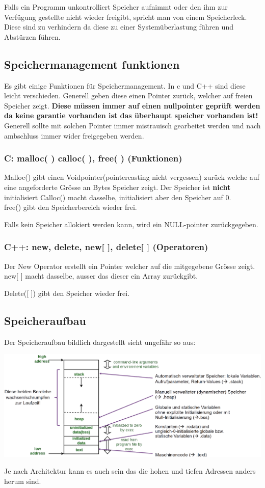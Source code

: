 Falls ein Programm unkontrolliert Speicher aufnimmt oder den ihm zur Verfügung gestellte nicht wieder freigibt, spricht man von einem Speicherleck. 
Diese sind zu verhindern da diese zu einer Systemüberlastung führen und Abstürzen führen.

\subsection{Speichermanagement funktionen}

Es gibt einige Funktionen für Speichermanagement. In c und C++ sind diese leicht verschieden. 
Generell geben diese einen Pointer zurück, welcher auf freien Speicher zeigt. 
\textbf{Diese müssen immer auf einen nullpointer geprüft werden da keine garantie vorhanden ist das überhaupt speicher vorhanden ist!}
Generell sollte mit solchen Pointer immer mistrauisch gearbeitet werden und nach ambschluss immer wider freigegeben werden.

\subsubsection{C: malloc( ) calloc( ), free( ) (Funktionen)}

Malloc() gibt einen Voidpointer(pointercasting nicht vergessen) zurück welche auf eine angeforderte Grösse an Bytes Speicher zeigt. 
Der Speicher ist \textbf{nicht} initialisiert
Calloc() macht dasselbe, initialisiert aber den Speicher auf 0.\\
free() gibt den Speicherbereich wieder frei.



Falls kein Speicher allokiert werden kann, wird ein NULL-pointer zurückgegeben.

\subsubsection{C++: new, delete, new[ ], delete[ ] (Operatoren)}

Der New Operator erstellt ein Pointer welcher auf die mitgegebene Grösse zeigt.
new[ ] macht dasselbe, ausser das dieser ein Array zurückgibt.

Delete([ ]) gibt den Speicher wieder frei.



\subsection{Speicheraufbau}

Der Speicheraufbau bildlich dargestellt sieht ungefähr so aus:

\begin{center}
    \includegraphics[width=\columnwidth]{pictures/memorylayout.png}  
\end{center}

Je nach Architektur kann es auch sein das die hohen und tiefen Adressen anders herum sind.